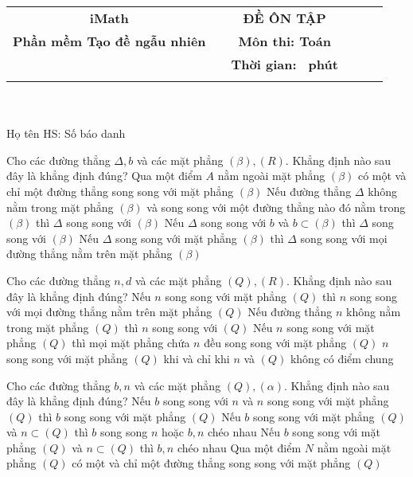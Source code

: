 \documentclass[12pt,a4paper]{article}
\newcommand{\tenso}{iMath}
\newcommand{\tentruong}{Phần mềm Tạo đề ngẫu nhiên}
\newcommand{\tenkythi}{ĐỀ ÔN TẬP}
\newcommand{\tenmonthi}{Môn thi: Toán}
\newcommand{\thoigian}{}
\newcommand{\tieude}[1]{
   \begin{tabular}{cm{3cm}cm{3cm}cm{3cm}}
    {\bf \tenso} & & {\bf \tenkythi} \\
    {\bf \tentruong} & & {\bf \tenmonthi}\\
    && {\bf Thời gian: \bf \thoigian \, phút}\\
    && { \fbox{\bf Mã đề: #1}}
   \end{tabular}\\\\
    
   {Họ tên HS: \dotfill Số báo danh \dotfill}\\
}
\newcommand{\chantrang}[2]{\rfoot{Trang \thepage $-$ Mã đề #2}}
\begin{document}


\tieude{001}
\chantrang{\pageref{LastPage}}{001}
\setcounter{page}{1}
\begin{ex}
	Cho các đường thẳng ${\Delta,b}$ và các mặt phẳng ${(\beta), (R)}$. Khẳng định nào sau đây là khẳng định đúng? 
	\choice
	{ Qua một điểm ${A}$ nằm ngoài mặt phẳng ${(\beta)}$ có một và chỉ một đường thẳng song song với mặt phẳng ${(\beta)}$ }
	{ \True Nếu đường thẳng ${\Delta}$ không nằm trong mặt phẳng ${(\beta)}$ và song song với một đường thẳng nào đó nằm trong ${(\beta)}$ thì ${\Delta}$ song song với ${(\beta)}$ }
	{ Nếu ${\Delta}$ song song với ${b}$ và $b\subset (\beta)$ thì ${\Delta}$ song song với ${(\beta)}$ }
	{ Nếu ${\Delta}$ song song với mặt phẳng ${(\beta)}$ thì ${\Delta}$ song song với mọi đường thẳng nằm trên mặt phẳng ${(\beta)}$ }
	\end{ex}

\begin{ex}
	Cho các đường thẳng ${n,d}$ và các mặt phẳng ${(Q), (R)}$. Khẳng định nào sau đây là khẳng định đúng? 
	\choice
	{ Nếu ${n}$ song song với mặt phẳng ${(Q)}$ thì ${n}$ song song với mọi đường thẳng nằm trên mặt phẳng ${(Q)}$ }
	{ Nếu đường thẳng ${n}$ không nằm trong mặt phẳng ${(Q)}$ thì ${n}$ song song với ${(Q)}$ }
	{ Nếu ${n}$ song song với mặt phẳng ${(Q)}$ thì mọi mặt phẳng chứa ${n}$ đều song song với mặt phẳng ${(Q)}$ }
	{ \True ${n}$ song song với mặt phẳng ${(Q)}$ khi và chỉ khi ${n}$ và ${(Q)}$ không có điểm chung }
	\end{ex}

\begin{ex}
	Cho các đường thẳng ${b,n}$ và các mặt phẳng ${(Q), (\alpha)}$. Khẳng định nào sau đây là khẳng định đúng? 
	\choice
	{ Nếu ${b}$ song song với ${n}$ và ${n}$ song song với mặt phẳng ${(Q)}$ thì ${b}$ song song với mặt phẳng ${(Q)}$ }
	{ \True Nếu ${b}$ song song với mặt phẳng ${(Q)}$ và $n\subset (Q)$ thì ${b}$ song song ${n}$ hoặc ${b,n}$ chéo nhau }
	{ Nếu ${b}$ song song với mặt phẳng ${(Q)}$ và $n\subset (Q)$ thì ${b,n}$ chéo nhau }
	{ Qua một điểm ${N}$ nằm ngoài mặt phẳng ${(Q)}$ có một và chỉ một đường thẳng song song với mặt phẳng ${(Q)}$ }
	\end{ex}
\end{document}
